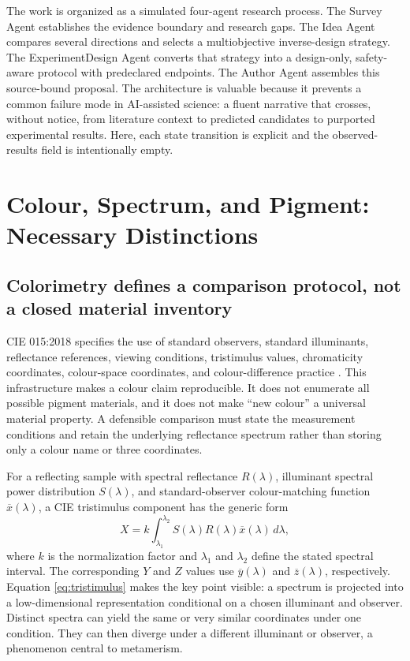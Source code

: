 \documentclass[conference]{IEEEtran}
\begin{document}
The work is organized as a simulated four-agent research process. The Survey Agent establishes the evidence boundary and research gaps. The Idea Agent compares several directions and selects a multiobjective inverse-design strategy. The ExperimentDesign Agent converts that strategy into a design-only, safety-aware protocol with predeclared endpoints. The Author Agent assembles this source-bound proposal. The architecture is valuable because it prevents a common failure mode in AI-assisted science: a fluent narrative that crosses, without notice, from literature context to predicted candidates to purported experimental results. Here, each state transition is explicit and the observed-results field is intentionally empty.

\section{Colour, Spectrum, and Pigment: Necessary Distinctions}

\subsection{Colorimetry defines a comparison protocol, not a closed material inventory}

CIE 015:2018 specifies the use of standard observers, standard illuminants, reflectance references, viewing conditions, tristimulus values, chromaticity coordinates, colour-space coordinates, and colour-difference practice \cite{cie2018}. This infrastructure makes a colour claim reproducible. It does not enumerate all possible pigment materials, and it does not make ``new colour'' a universal material property. A defensible comparison must state the measurement conditions and retain the underlying reflectance spectrum rather than storing only a colour name or three coordinates.

For a reflecting sample with spectral reflectance $R(\lambda)$, illuminant spectral power distribution $S(\lambda)$, and standard-observer colour-matching function $\overline{x}(\lambda)$, a CIE tristimulus component has the generic form
\begin{equation}
X=k\int_{\lambda_1}^{\lambda_2}S(\lambda)R(\lambda)\overline{x}(\lambda)\,d\lambda,
\label{eq:tristimulus}
\end{equation}
where $k$ is the normalization factor and $\lambda_1$ and $\lambda_2$ define the stated spectral interval. The corresponding $Y$ and $Z$ values use $\overline{y}(\lambda)$ and $\overline{z}(\lambda)$, respectively. Equation \eqref{eq:tristimulus} makes the key point visible: a spectrum is projected into a low-dimensional representation conditional on a chosen illuminant and observer. Distinct spectra can yield the same or very similar coordinates under one condition. They can then diverge under a different illuminant or observer, a phenomenon central to metamerism.
\end{document}
